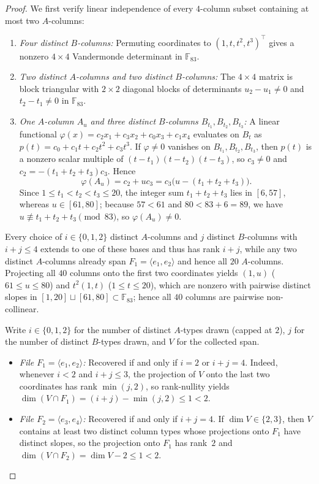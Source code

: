 \documentclass[11pt]{article}
\theoremstyle{plain}
\theoremstyle{definition}
\theoremstyle{remark}
\begin{document}
\begin{proof}
We first verify linear independence of every $4$-column subset containing at most two $A$-columns:
\begin{enumerate}[label=\textup{(\roman*)}]
\item \emph{Four distinct $B$-columns:} Permuting coordinates to $(1, t, t^2, t^3)^\top$ gives a nonzero $4 \times 4$ Vandermonde determinant in $\mathbb{F}_{83}$.
\item \emph{Two distinct $A$-columns and two distinct $B$-columns:} The $4 \times 4$ matrix is block triangular with $2 \times 2$ diagonal blocks of determinants $u_2 - u_1 \neq 0$ and $t_2 - t_1 \neq 0$ in $\mathbb{F}_{83}$.
\item \emph{One $A$-column $A_u$ and three distinct $B$-columns $B_{t_1}, B_{t_2}, B_{t_3}$:} A linear functional $\varphi(x) = c_2 x_1 + c_3 x_2 + c_0 x_3 + c_1 x_4$ evaluates on $B_t$ as $p(t) = c_0 + c_1 t + c_2 t^2 + c_3 t^3$. If $\varphi \neq 0$ vanishes on $B_{t_1}, B_{t_2}, B_{t_3}$, then $p(t)$ is a nonzero scalar multiple of $(t - t_1)(t - t_2)(t - t_3)$, so $c_3 \neq 0$ and $c_2 = -(t_1 + t_2 + t_3)c_3$. Hence
\[
\varphi(A_u) = c_2 + u c_3 = c_3\bigl(u - (t_1 + t_2 + t_3)\bigr).
\]
Since $1 \le t_1 < t_2 < t_3 \le 20$, the integer sum $t_1 + t_2 + t_3$ lies in $[6, 57]$, whereas $u \in [61, 80]$; because $57 < 61$ and $80 < 83 + 6 = 89$, we have $u \not\equiv t_1 + t_2 + t_3 \pmod{83}$, so $\varphi(A_u) \neq 0$.
\end{enumerate}

Every choice of $i \in \{0, 1, 2\}$ distinct $A$-columns and $j$ distinct $B$-columns with $i + j \le 4$ extends to one of these bases and thus has rank $i + j$, while any two distinct $A$-columns already span $F_1 = \langle e_1, e_2 \rangle$ and hence all $20$ $A$-columns.
Projecting all $40$ columns onto the first two coordinates yields $(1, u)$ ($61 \le u \le 80$) and $t^2(1, t)$ ($1 \le t \le 20$), which are nonzero with pairwise distinct slopes in $[1, 20] \sqcup [61, 80] \subset \mathbb{F}_{83}$; hence all $40$ columns are pairwise non-collinear.

Write $i \in \{0, 1, 2\}$ for the number of distinct $A$-types drawn (capped at $2$), $j$ for the number of distinct $B$-types drawn, and $V$ for the collected span.
\begin{itemize}[leftmargin=1.6em]
\item \emph{File $F_1 = \langle e_1, e_2 \rangle$:} Recovered if and only if $i = 2$ or $i + j = 4$. Indeed, whenever $i < 2$ and $i + j \le 3$, the projection of $V$ onto the last two coordinates has rank $\min(j, 2)$, so rank-nullity yields $\dim(V \cap F_1) = (i + j) - \min(j, 2) \le 1 < 2$.
\item \emph{File $F_2 = \langle e_3, e_4 \rangle$:} Recovered if and only if $i + j = 4$. If $\dim V \in \{2, 3\}$, then $V$ contains at least two distinct column types whose projections onto $F_1$ have distinct slopes, so the projection onto $F_1$ has rank~$2$ and $\dim(V \cap F_2) = \dim V - 2 \le 1 < 2$.
\end{itemize}


\end{proof}
\end{document}
